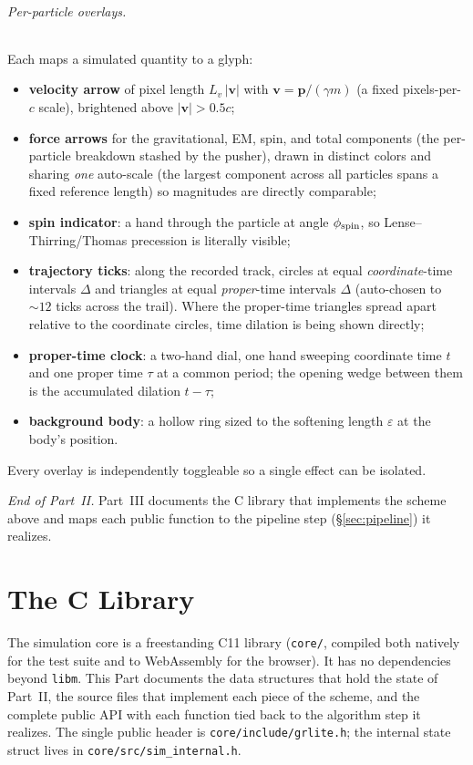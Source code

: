 \documentclass[11pt]{article}
\newcommand{\vv}[1]{\mathbf{#1}}           %
\begin{document}
\paragraph{Per-particle overlays.} Each maps a simulated quantity to a glyph:
\begin{itemize}\setlength\itemsep{2pt}
  \item \textbf{velocity arrow} of pixel length $L_v\,|\vv v|$ with
  $\vv v=\vv p/(\gamma m)$ (a fixed pixels-per-$c$ scale), brightened above
  $|\vv v|>0.5c$;
  \item \textbf{force arrows} for the gravitational, EM, spin, and total
  components (the per-particle breakdown stashed by the pusher), drawn in
  distinct colors and sharing \emph{one} auto-scale (the largest component across
  all particles spans a fixed reference length) so magnitudes are directly
  comparable;
  \item \textbf{spin indicator}: a hand through the particle at angle
  $\phi_{\rm spin}$, so Lense--Thirring/Thomas precession is literally visible;
  \item \textbf{trajectory ticks}: along the recorded track, circles at equal
  \emph{coordinate}-time intervals $\Delta$ and triangles at equal
  \emph{proper}-time intervals $\Delta$ (auto-chosen to $\sim12$ ticks across the
  trail). Where the proper-time triangles spread apart relative to the
  coordinate circles, time dilation is being shown directly;
  \item \textbf{proper-time clock}: a two-hand dial, one hand sweeping coordinate
  time $t$ and one proper time $\tau$ at a common period; the opening wedge
  between them is the accumulated dilation $t-\tau$;
  \item \textbf{background body}: a hollow ring sized to the softening length
  $\varepsilon$ at the body's position.
\end{itemize}
Every overlay is independently toggleable so a single effect can be isolated.

\bigskip
\noindent\textit{End of Part~II.}  Part~III documents the C library that
implements the scheme above and maps each public function to the pipeline step
(\S\ref{sec:pipeline}) it realizes.

\part{The C Library}

The simulation core is a freestanding C11 library (\texttt{core/}, compiled both
natively for the test suite and to WebAssembly for the browser). It has no
dependencies beyond \texttt{libm}. This Part documents the data structures that
hold the state of Part~II, the source files that implement each piece of the
scheme, and the complete public API with each function tied back to the
algorithm step it realizes. The single public header is
\texttt{core/include/grlite.h}; the internal state struct lives in
\texttt{core/src/sim\_internal.h}.
\end{document}
